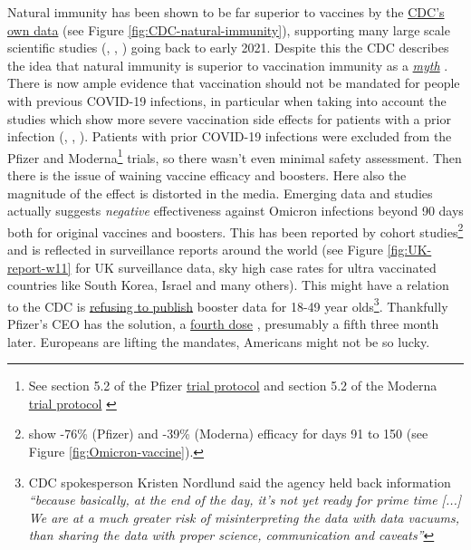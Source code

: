 \documentclass[11pt,a4paper,notitlepage]{report}
\begin{document}

Natural immunity has been shown to be far superior to vaccines by the \href{https://www.cdc.gov/mmwr/volumes/71/wr/mm7104e1.htm#F1_down}{CDC's own data} \cite{cdc28012020} (see Figure \ref{fig:CDC-natural-immunity}), supporting many large scale scientific studies (\cite{Gazit2021.08.24.21262415}, \cite{doi:10.1126/science.abf4063}, \cite{Goldberg2021.04.20.21255670}) going back to early 2021. Despite this the CDC describes the idea that natural immunity is superior to vaccination immunity as a \href{https://www.cdc.gov/coronavirus/2019-ncov/vaccines/facts.html}{\textit{myth}} \cite{cdc15122021} . There is now ample evidence that vaccination should not be mandated for people with previous COVID-19 infections, in particular when taking into account the studies which show more severe vaccination side effects for patients with a prior infection (\cite{Monforte2021}, \cite{LI20221082}, \cite{Raw22}). Patients with prior COVID-19 infections were excluded from the Pfizer and Moderna\footnote{See section 5.2 of the Pfizer \href{https://cdn.pfizer.com/pfizercom/2020-11/C4591001_Clinical_Protocol_Nov2020.pdf}{trial protocol} \cite{pfizer102020} and section 5.2 of the Moderna \href{https://www.modernatx.com/sites/default/files/mRNA-1273-P301-Protocol.pdf}{trial protocol} \cite{moderna102020}} trials, so there wasn't even minimal safety assessment. Then there is the issue of waining vaccine efficacy and boosters. Here also the magnitude of the effect is distorted in the media. Emerging data and studies actually suggests \textit{negative} effectiveness against Omicron infections beyond 90 days both for original vaccines and boosters. This has been reported by cohort studies\footnote{\citet{Hansen2021.12.20.21267966} show -76\% (Pfizer) and -39\% (Moderna) efficacy for days 91 to 150 (see Figure \ref{fig:Omicron-vaccine}).} and is reflected in surveillance reports around the world (see Figure \ref{fig:UK-report-w11} for UK surveillance data, sky high case rates for ultra vaccinated countries like South Korea, Israel and many others). This might have a relation to the CDC is \href{https://www.webmd.com/lung/news/20220222/report-cdc-not-publishing-large-amounts-of-covid-19-data}{refusing to publish} \cite{webmd22022022} booster data for 18-49 year olds\footnote{CDC spokesperson Kristen Nordlund said the agency held back information \textit{“because basically, at the end of the day, it’s not yet ready for prime time [...] We are at a much greater risk of misinterpreting the data with data vacuums, than sharing the data with proper science, communication and caveats”}}. Thankfully Pfizer's CEO has the solution, a \href{https://www.cbsnews.com/news/covid-vaccine-fourth-dose-booster-pfizer-ceo-albert-bourla/}{fourth dose} \cite{cbsnews14032022}, presumably a fifth three month later. Europeans are lifting the mandates, Americans might not be so lucky.
\end{document}

